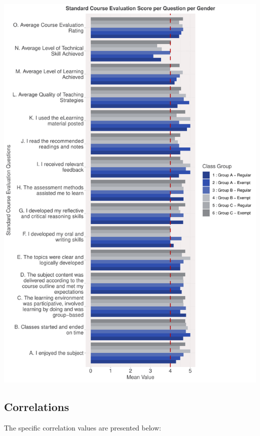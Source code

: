 \documentclass[
]{article}
\begin{document}
\includegraphics{10.b.BBT4206-End-SemesterCourseEvaluation-20230821-20231128-BI2-BBIT4-2_files/figure-latex/VisualizationsForCourseEvaluationResultsperGroup-1.pdf}

\newpage

\subsection{Correlations}\label{correlations}

The specific correlation values are presented below:
\end{document}
